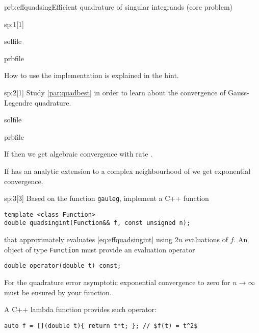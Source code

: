 \begin{samproblem}{prb:effquadsing}{Efficient quadrature of singular integrands (core problem)}
\begin{subproblem}{sp:1}[1]
\begin{samwriteprbpart}{solfile}
\begin{writeverbatim}{prbfile}
\begin{samsolution}
        How to use the implementation is explained in the hint.
      \end{samsolution}
    \end{writeverbatim}
  \end{samwriteprbpart}
\end{subproblem}

\begin{subproblem}{sp:2}[1]
  Study \cref{par:quadbest} in order to learn about the convergence of
  Gauss-Legendre quadrature. 

  \begin{samwriteprbpart}{solfile}
    \begin{writeverbatim}{prbfile}
      \begin{samsolution}
        If  then we get algebraic convergence with rate .

        If  has an analytic extension to a complex neighbourhood of \Blue{$[a,b]$}
        we get exponential convergence.
      \end{samsolution}
    \end{writeverbatim}
  \end{samwriteprbpart}

\end{subproblem}

\begin{subproblem}{sp:3}[3] 
  Based on the function \verb|gauleg|, implement a C++ function
 \begin{lstlisting}[style=cpp]
template <class Function>
double quadsingint(Function&& f, const unsigned n);
 \end{lstlisting}
 that approximately evaluates \eqref{eq:effquadsingint} using $2n$ evaluations of $f$. 
 An object of type \verb|Function| must provide an evaluation operator
 \begin{lstlisting}[style=cpp]
double operator(double t) const;
 \end{lstlisting}
 For the quadrature error asymptotic exponential convergence to zero for
 $n \rightarrow \infty$ must be ensured by your function.
 
 
 \begin{samhint}
  A C++ lambda function provides such operator:
  \begin{lstlisting}[style=cpp]
auto f = [](double t){ return t*t; }; // $f(t) = t^2$
  \end{lstlisting}
 \end{samhint}
 

\end{subproblem}
\end{samproblem}
